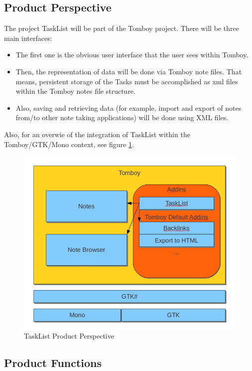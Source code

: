 \subsection{Product Perspective}
\label{description:perspective}
  The project TaskList will be part of the Tomboy project. There will be three main interfaces:

  \begin{itemize}
    \item The first one is the obvious user interface that the user sees within Tomboy.
    \item Then, the representation of data will be done via Tomboy note files. That means, persistent storage of the Tasks must be accomplished as xml files within the Tomboy notes file structure.
    \item Also, saving and retrieving data (for example, import and export of notes from/to other note taking applications) will be done using XML files.
  \end{itemize}

  Also, for an overwie of the integration of TaskList within the Tomboy/GTK/Mono context, see figure \ref{perspective}.

  \begin{figure}[h]
    \includegraphics[width=\textwidth]{graphics/product_perspective_diagram.png}
    \caption{TaskList Product Perspective}
    \label{perspective}
  \end{figure}


\subsection{Product Functions}
\label{description:functions}


